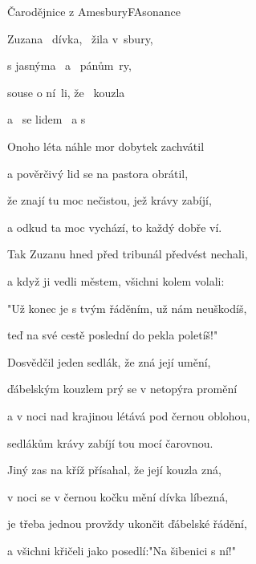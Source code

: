 \begin{song}{Čarodějnice z Amesbury}{F}{Asonance}
  \begin{SBVerse}
    Zuzana  dívka,  žila v sbury,

s jasnýma  a  pánům ry,

souse o ní li, že  kouzla 

a  se lidem  a s   

  \end{SBVerse}

  \begin{SBVerse}
Onoho léta náhle mor dobytek zachvátil

a pověrčivý lid se na pastora obrátil,

že znají tu moc nečistou, jež krávy zabíjí,

a odkud ta moc vychází, to každý dobře ví.

  \end{SBVerse}

  \begin{SBVerse}
Tak Zuzanu hned před tribunál předvést nechali,

a když ji vedli městem, všichni kolem volali:

"Už konec je s tvým řáděním, už nám neuškodíš,

teď na své cestě poslední do pekla poletíš!"

  \end{SBVerse}

  \begin{SBVerse}
Dosvědčil jeden sedlák, že zná její umění,

ďábelským kouzlem prý se v netopýra promění

a v noci nad krajinou létává pod černou oblohou,

sedlákům krávy zabíjí tou mocí čarovnou.

  \end{SBVerse}

  \begin{SBVerse}
Jiný zas na kříž přísahal, že její kouzla zná,

v noci se v černou kočku mění dívka líbezná,

je třeba jednou provždy ukončit ďábelské řádění,

a všichni křičeli jako posedlí:"Na šibenici s ní!"


\end{SBVerse}
\end{song}
